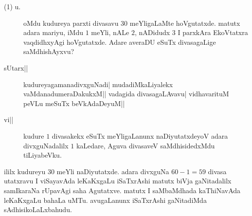 \newpage



\begin{description}
\item[(1) u.] oMdu kudureya parxti divasavu $30$ meYligaLaMte
  hoVgutatxde. matutx adara mariyu, iMdu $1$ meYli, nALe $2$, nADidudx
  $3$ I parxkAra EkoVtatxra vaqdidhxyAgi hoVgutatxde. Adare averaDU
  eSuTx divasagaLige saMdhishAyxvu?

\item[sUtarx||] kudureyagamanadivxguNadi| mudadiMkaLiyalekx
  vaMdanadumeraDakukxM|| vadagida divasagaLAvavu| vidhavarituM peVLu
  meSuTx beVkAdaDeyuM||

\item[vi||] kudure $1$ divasakekx eSuTx meYligaLanunx naDiyutatxdeyoV
  adara divxguNadalilx $1$ kaLedare, Aguva divasaveV saMdhisidedxMdu
  tiLiyabeVku. 
\end{description}

ililx kudureyu $30$ meYli naDiyutatxde. adara divxguNa $60-1=59$
divasa utatxravu I viSayavAda leKaKxgaLu iSaTxrAshi matutx biVja
gaNitadalilx samIkaraNa rUpavAgi saha Agutatxve. matutx I saMbaMdhada
kaThiNavAda leKaKxgaLu bahaLa uMTu. avugaLanunx iSaTxrAshi gaNitadiMda
sAdhisikoLaLxbahudu. 

\vskip 1cm
